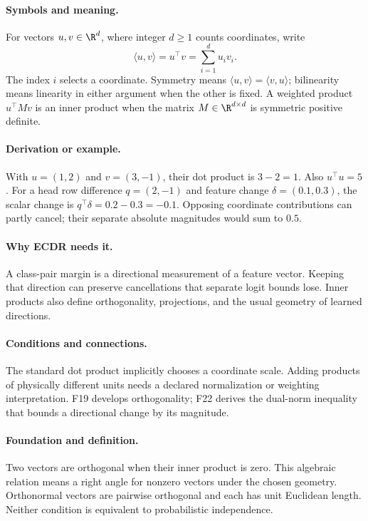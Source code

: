 \paragraph{Symbols and meaning.}
For vectors $u,v\in\R^d$, where integer $d\ge1$ counts coordinates,
write
\[
 \langle u,v\rangle=u^\top v=\sum_{i=1}^{d}u_i v_i.
\]
The index $i$ selects a coordinate. Symmetry means
$\langle u,v\rangle=\langle v,u\rangle$; bilinearity means linearity
in either argument when the other is fixed. A weighted product
$u^\top Mv$ is an inner product when the matrix
$M\in\R^{d\times d}$ is symmetric positive definite.
\paragraph{Derivation or example.}
With $u=(1,2)$ and $v=(3,-1)$, their dot product is $3-2=1$.
Also $u^\top u=5$. For a head row difference $q=(2,-1)$ and feature
change $\delta=(0.1,0.3)$, the scalar change is
$q^\top\delta=0.2-0.3=-0.1$. Opposing coordinate contributions can
partly cancel; their separate absolute magnitudes would sum to $0.5$.
\paragraph{Why ECDR needs it.}
A class-pair margin is a directional measurement of a feature vector.
Keeping that direction can preserve cancellations that separate logit
bounds lose. Inner products also define orthogonality, projections, and
the usual geometry of learned directions.
\paragraph{Conditions and connections.}
The standard dot product implicitly chooses a coordinate scale. Adding
products of physically different units needs a declared normalization
or weighting interpretation. F19 develops orthogonality; F22 derives the
dual-norm inequality that bounds a directional change by its magnitude.

\paragraph{Foundation and definition.}
Two vectors are orthogonal when their inner product is zero. This
algebraic relation means a right angle for nonzero vectors under the
chosen geometry. Orthonormal vectors are pairwise orthogonal and each
has unit Euclidean length. Neither condition is equivalent to
probabilistic independence.
